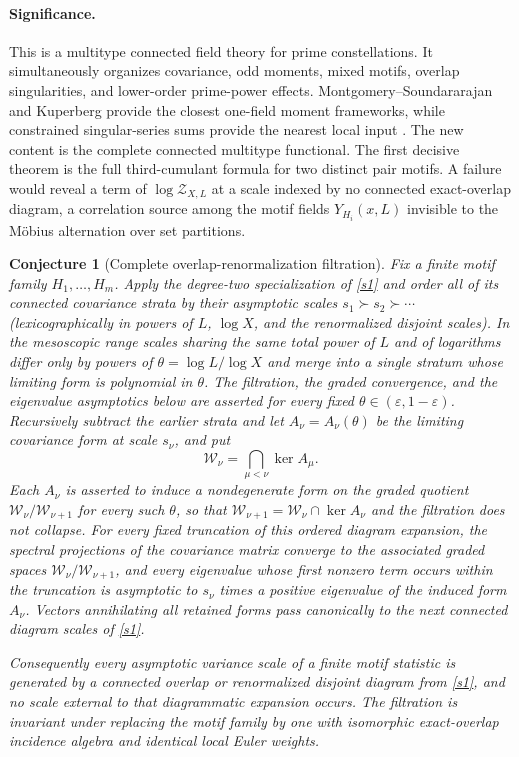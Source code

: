 \documentclass[11pt]{article}
\newtheorem{conjecture}{Conjecture}
\theoremstyle{definition}
\newcommand{\eps}{\varepsilon}
\begin{document}
\paragraph{Significance.}
This is a multitype connected field theory for prime constellations.  It simultaneously
organizes covariance, odd moments, mixed motifs, overlap singularities, and lower-order
prime-power effects.  Montgomery--Soundararajan and Kuperberg provide the closest
one-field moment frameworks, while constrained singular-series sums provide the nearest
local input \cite{MS,Kuperberg,KRR}.  The new content is the complete connected
multitype functional.  The first decisive theorem is the full third-cumulant formula for two distinct pair motifs. A failure would reveal a term of $\log\mathcal Z_{X,L}$ at a scale indexed by no connected exact-overlap diagram, a correlation source among the motif fields $Y_{H_i}(x,L)$ invisible to the Möbius alternation over set partitions.

\begin{conjecture}[Complete overlap-renormalization filtration]\label{s2}
Fix a finite motif family $H_1,\ldots,H_m$.  Apply the degree-two specialization of
\cref{s1} and order all of its connected covariance strata by their asymptotic scales
$s_1\succ s_2\succ\cdots$ (lexicographically in powers of $L$, $\log X$, and the
renormalized disjoint scales).  In the mesoscopic range scales sharing the same total
power of $L$ and of logarithms differ only by powers of $\theta=\log L/\log X$ and
merge into a single stratum whose limiting form is polynomial in $\theta$.  The filtration, the graded convergence, and the eigenvalue asymptotics below are asserted for every fixed $\theta\in(\eps,1-\eps)$. Recursively subtract the earlier strata and let $A_\nu=A_\nu(\theta)$ be the limiting covariance form at scale $s_\nu$, and put
\[
 \mathcal W_\nu=\bigcap_{\mu<\nu}\ker A_\mu.
\]
Each $A_\nu$ is asserted to induce a nondegenerate form on the graded quotient $\mathcal W_\nu/\mathcal W_{\nu+1}$ for every such $\theta$, so that $\mathcal W_{\nu+1}=\mathcal W_\nu\cap\ker A_\nu$ and the filtration does not collapse.
For every fixed truncation of this ordered diagram expansion, the spectral projections
of the covariance matrix converge to the associated graded spaces
$\mathcal W_\nu/\mathcal W_{\nu+1}$, and every eigenvalue whose first nonzero term occurs
within the truncation is asymptotic to $s_\nu$ times a positive eigenvalue of the induced
form $A_\nu$.  Vectors annihilating all retained forms pass canonically to the next
connected diagram scales of \cref{s1}.

Consequently every asymptotic variance scale of a finite motif statistic is generated by
a connected overlap or renormalized disjoint diagram from \cref{s1}, and no scale
external to that diagrammatic expansion occurs.  The filtration is invariant under replacing the
motif family by one with isomorphic exact-overlap incidence algebra and identical local
Euler weights.
\end{conjecture}
\end{document}
